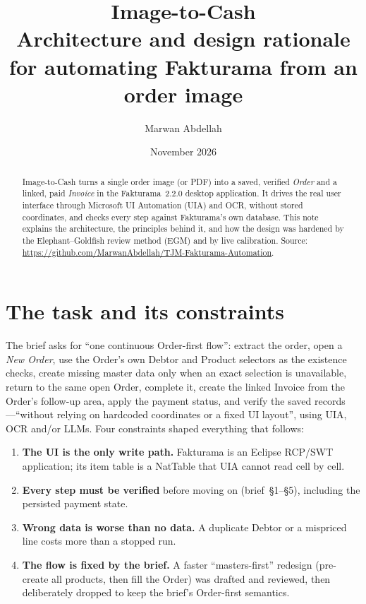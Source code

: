 \documentclass[11pt,a4paper]{article}
\title{\textbf{Image-to-Cash}\\[0.2em]\large Architecture and design rationale for automating Fakturama from an order image}
\author{Marwan Abdellah}
\date{November 2026}
\begin{document}
\maketitle
\vspace{-1.5em}

\begin{abstract}
\noindent Image-to-Cash turns a single order image (or PDF) into a saved, verified \emph{Order} and a linked, paid
\emph{Invoice} in the Fakturama~2.2.0 desktop application. It drives the real user interface through Microsoft
UI Automation (UIA) and OCR, without stored coordinates, and checks every step against Fakturama's own database. This note
explains the architecture, the principles behind it, and how the design was hardened by the Elephant--Goldfish review
method (EGM) and by live calibration. Source: \url{https://github.com/MarwanAbdellah/TJM-Fakturama-Automation}.
\end{abstract}

\section{The task and its constraints}
The brief asks for ``one continuous Order-first flow'': extract the order, open a \emph{New Order}, use the Order's own
Debtor and Product selectors as the existence checks, create missing master data only when an exact selection is
unavailable, return to the same open Order, complete it, create the linked Invoice from the Order's follow-up area, apply
the payment status, and verify the saved records---``without relying on hardcoded coordinates or a fixed UI layout'',
using UIA, OCR and/or LLMs. Four constraints shaped everything that follows:
\begin{enumerate}
  \item \textbf{The UI is the only write path.} Fakturama is an Eclipse RCP/SWT application; its item table is a NatTable
        that UIA cannot read cell by cell.
  \item \textbf{Every step must be verified} before moving on (brief~\S1--\S5), including the persisted payment state.
  \item \textbf{Wrong data is worse than no data.} A duplicate Debtor or a mispriced line costs more than a stopped run.
  \item \textbf{The flow is fixed by the brief.} A faster ``masters-first'' redesign (pre-create all products, then fill the
        Order) was drafted and reviewed, then deliberately dropped to keep the brief's Order-first semantics.
\end{enumerate}
\end{document}
